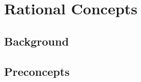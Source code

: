 \chapter{Rational Concepts}
\label{chapter:rational-concepts}

\section{Background}
\clearpage

\section{Preconcepts}
\clearpage